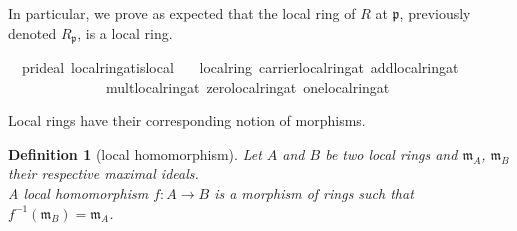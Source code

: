 \documentclass[12pt]{scrartcl}
\newtheorem{definition}[proposition]{Definition}
\begin{document}
In particular, we prove as expected that the local ring of $R$ at $\mathfrak{p}$, previously denoted $R_{\mathfrak{p}}$, is a local ring.

\begin{isabelle}
\isamarkupfalse%
\ {\isacharparenleft}{\kern0pt}\ pr{\isacharunderscore}{\kern0pt}ideal{\isacharparenright}{\kern0pt}\ local{\isacharunderscore}{\kern0pt}ring{\isacharunderscore}{\kern0pt}at{\isacharunderscore}{\kern0pt}is{\isacharunderscore}{\kern0pt}local{\isacharcolon}{\kern0pt}\isanewline
\ \ \ {\isachardoublequoteopen}local{\isacharunderscore}{\kern0pt}ring\ carrier{\isacharunderscore}{\kern0pt}local{\isacharunderscore}{\kern0pt}ring{\isacharunderscore}{\kern0pt}at\ add{\isacharunderscore}{\kern0pt}local{\isacharunderscore}{\kern0pt}ring{\isacharunderscore}{\kern0pt}at\ \isanewline
\ \ \ \ \ \ \ \ \ \ \ \ \ \ mult{\isacharunderscore}{\kern0pt}local{\isacharunderscore}{\kern0pt}ring{\isacharunderscore}{\kern0pt}at\ zero{\isacharunderscore}{\kern0pt}local{\isacharunderscore}{\kern0pt}ring{\isacharunderscore}{\kern0pt}at\ one{\isacharunderscore}{\kern0pt}local{\isacharunderscore}{\kern0pt}ring{\isacharunderscore}{\kern0pt}at{\isachardoublequoteclose}
\end{isabelle}

Local rings have their corresponding notion of morphisms. 

\begin{definition}[local homomorphism]
	Let $A$ and $B$ be two local rings and $\mathfrak{m}_A$, $\mathfrak{m}_B$ their respective maximal ideals. \\
	A local homomorphism $f: A \rightarrow B$ is a morphism of rings such that $f^{-1} (\mathfrak{m}_B) = \mathfrak{m}_A$. 
\end{definition}
\end{document}
